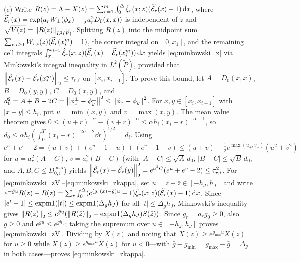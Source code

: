 (c) Write $R(z)=\Lambda-X(z)=\sum_{r=1}^m\int_0^\Delta\hat\xi_r(x;z)(\widetilde{\mathcal{E}}_r(x)-1)\,\mathrm{d} x$, where
$\widetilde{\mathcal{E}}_r(x)=\exp(a_r W_\perp(\phi_x)-\tfrac12 a_r^2 D_0(x,x))$ is independent of $z$ and
$\sqrt{V(z)}=\left\lVert R(z)\right\rVert_{L^2(\widetilde{P})}$. Splitting $R(z)$ into the midpoint sum
$\sum_{r,i\ge1}W_{r,i}(z)(\widetilde{\mathcal{E}}_r(x_i^m)-1)$, the corner integral on $[0,x_1]$, and the
remaining cell integrals $\int_{x_i}^{x_{i+1}}\hat\xi_r(x;z)(\widetilde{\mathcal{E}}_r(x)-\widetilde{\mathcal{E}}_r(x_i^m))\,\mathrm{d} x$
yields \eqref{eq:minkowski_x} via Minkowski's integral inequality in $L^2(\widetilde{P})$, provided that
$\left\lVert \widetilde{\mathcal{E}}_r(x)-\widetilde{\mathcal{E}}_r(x_i^m)\right\rVert_2\le\tau_{r,i}$ on $[x_i,x_{i+1}]$. To prove this
bound, let $A=D_0(x,x)$, $B=D_0(y,y)$, $C=D_0(x,y)$, and
$d_0^2=A+B-2C=\left\lVert \phi_x^\perp-\phi_y^\perp\right\rVert^2\le\left\lVert \phi_x-\phi_y\right\rVert^2$.
For $x,y\in[x_i,x_{i+1}]$ with $|x-y|\le h_i$, put $u=\min(x,y)$ and $v=\max(x,y)$. The mean value theorem gives
$0\le(u+r)^{-\alpha}-(v+r)^{-\alpha}\le\alpha h_i(x_i+r)^{-\alpha-1}$, so
$d_0\le\alpha h_i(\int_0^T(x_i+r)^{-2\alpha-2}\dd r)^{1/2}=\bar d_i$. Using
$e^u+e^v-2=(u+v)+(e^u-1-u)+(e^v-1-v)\le(u+v)+\frac12 e^{\max(u_+,v_+)}(u^2+v^2)$ for
$u=a_r^2(A-C)$, $v=a_r^2(B-C)$ (with $|A-C|\le\sqrt{A}\,d_0$, $|B-C|\le\sqrt{B}\,d_0$, and
$A,B,C\le D_{0,i}^{\max}$) yields
$\left\lVert \widetilde{\mathcal{E}}_r(x)-\widetilde{\mathcal{E}}_r(y)\right\rVert_2^2=e^{a_r^2 C}(e^u+e^v-2)\le\tau_{r,i}^2$.
For \eqref{eq:minkowski_zV}--\eqref{eq:minkowski_zkappa}, set $u=z-\bar z\in[-h_J,h_J]$ and write
$e^{-\bar g u}R(z)-R(\bar z)=\sum_r\int_0^\Delta(e^{(g_r(x)-\bar g)u}-1)\hat\xi_r(x;\bar z)(\widetilde{\mathcal{E}}_r(x)-1)\,\mathrm{d} x$.
Since $|e^t-1|\le\operatorname{expm1}(|t|)\le\operatorname{expm1}(\Delta_g h_J)$ for all $|t|\le\Delta_g h_J$, Minkowski's
inequality gives
$\left\lVert R(z)\right\rVert_2\le e^{\bar g u}(\left\lVert R(\bar z)\right\rVert_2+\operatorname{expm1}(\Delta_g h_J)S(\bar z))$.
Since $g_r=a_rg_0\ge0$, also $\bar g\ge0$ and $e^{\bar g u}\le e^{\bar g h_J}$; taking the supremum over
$u\in[-h_J,h_J]$ proves \eqref{eq:minkowski_zV}. Dividing by $X(z)$ and noting
that $X(z)\ge e^{g_{\min}u}X(\bar z)$ for $u\ge0$ while $X(z)\ge e^{g_{\max}u}X(\bar z)$ for $u<0$---with
$\bar g-g_{\min}=g_{\max}-\bar g=\Delta_g$ in both cases---proves \eqref{eq:minkowski_zkappa}.

